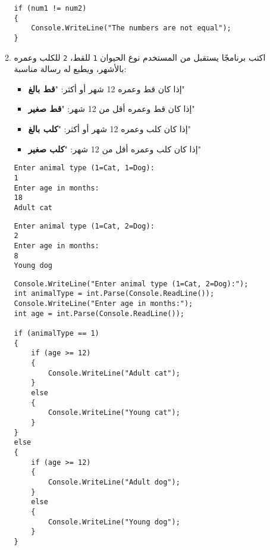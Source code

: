 ﻿\documentclass[12pt]{article}
\begin{document}
\begin{enumerate}[itemsep=3em]
\begin{enumerate}
\begin{boxSolution}
\begin{english}
\begin{verbatim}
if (num1 != num2)
{
    Console.WriteLine("The numbers are not equal");
}
\end{verbatim}
\end{english}
\end{boxSolution}
\fi
\clearpage
\fi

\item
اكتب برنامجًا يستقبل من المستخدم نوع الحيوان \texttt{1} للقط، \texttt{2} للكلب وعمره بالأشهر، ويطبع له رسالة مناسبة:
\begin{itemize}
\item إذا كان قط وعمره 12 شهر أو أكثر: "\textbf{قط بالغ}"
\item إذا كان قط وعمره أقل من 12 شهر: "\textbf{قط صغير}"
\item إذا كان كلب وعمره 12 شهر أو أكثر: "\textbf{كلب بالغ}"
\item إذا كان كلب وعمره أقل من 12 شهر: "\textbf{كلب صغير}"
\end{itemize}%
\ifdetailed
\begin{boxExample}[1]
\begin{english}
\begin{verbatim}
Enter animal type (1=Cat, 1=Dog):
1
Enter age in months:
18
Adult cat
\end{verbatim}
\end{english}
\end{boxExample}
\begin{boxExample}[2]
\begin{english}
\begin{verbatim}
Enter animal type (1=Cat, 2=Dog):
2
Enter age in months:
8
Young dog
\end{verbatim}
\end{english}
\end{boxExample}

\ifwithsols
\begin{boxSolution}
\begin{english}
\begin{verbatim}
Console.WriteLine("Enter animal type (1=Cat, 2=Dog):");
int animalType = int.Parse(Console.ReadLine());
Console.WriteLine("Enter age in months:");
int age = int.Parse(Console.ReadLine());

if (animalType == 1)
{
    if (age >= 12)
    {
        Console.WriteLine("Adult cat");
    }
    else
    {
        Console.WriteLine("Young cat");
    }
}
else
{
    if (age >= 12)
    {
        Console.WriteLine("Adult dog");
    }
    else
    {
        Console.WriteLine("Young dog");
    }
}
\end{verbatim}
\end{english}
\end{boxSolution}
\fi
\clearpage
\fi


\end{enumerate}
\end{enumerate}
\end{document}
